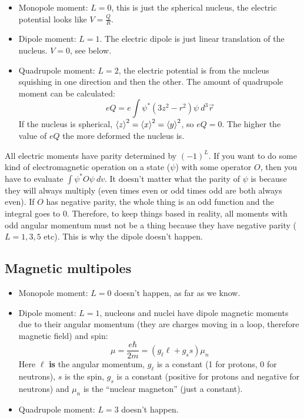 \documentclass[letter]{article}
\begin{document}
\begin{itemize}
\item Monopole moment: $L=0$, this is just the spherical nucleus, the electric
  potential looks like $V = \frac{Q}{R}$.
\item Dipole moment: $L=1$. The electric dipole is just linear
  translation of the nucleus. $V=0$, see below.
\item Quadrupole moment: $L=2$, the electric potential is from the
  nucleus squishing in one direction and then the other. The amount of
  quadrupole moment can be calculated:
  \begin{equation*}
    eQ=e\int\psi^*(3z^2-r^2)\psi~d^3\vec{r}
  \end{equation*}
  If the nucleus is spherical,
  $\braket{z}^2=\braket{x}^2=\braket{y}^2$, so $eQ=0$. The higher the
  value of $eQ$ the more deformed the nucleus is.
\end{itemize}

All electric moments have parity determined by $(-1)^L$. If you want
to do some kind of electromagnetic operation on a state ($\psi$) with
some operator $O$, then you have to evaluate $\int\psi^*O\psi~dv$. It
doesn't matter what the parity of $\psi$ is because they will always
multiply (even times even or odd times odd are both always even). If
$O$ has negative parity, the whole thing is an odd function and the
integral goes to 0. Therefore, to keep things based in reality, all
 moments with odd angular momentum must not be a thing because they
 have negative parity ($L=1,3,5$ etc). This is why the dipole doesn't happen.

\subsection{Magnetic multipoles}

\begin{itemize}
\item Monopole moment: $L=0$ doesn't happen, as far as we know.
\item Dipole moment: $L=1$, nucleons and nuclei have dipole magnetic
  moments due to their angular momentum (they are charges moving in a
  loop, therefore magnetic field) and spin:
  \begin{equation*}
    \mu = \frac{e\hbar}{2m}=(g_{\ell}\ell+g_ss)\mu_n
  \end{equation*}
Here $\ell$ \textbf{is} the angular momentum, $g_{\ell}$ is a constant (1 for
protons, 0 for neutrons), $s$ is the spin, $g_s$ is a constant
(positive for protons and negative for neutrons)  and $\mu_n$ is the ``nuclear magneton'' (just
a constant).\cite[pp. 73]{krane}
\item Quadrupole moment: $L=3$ doesn't happen.
\end{itemize}
\end{document}
